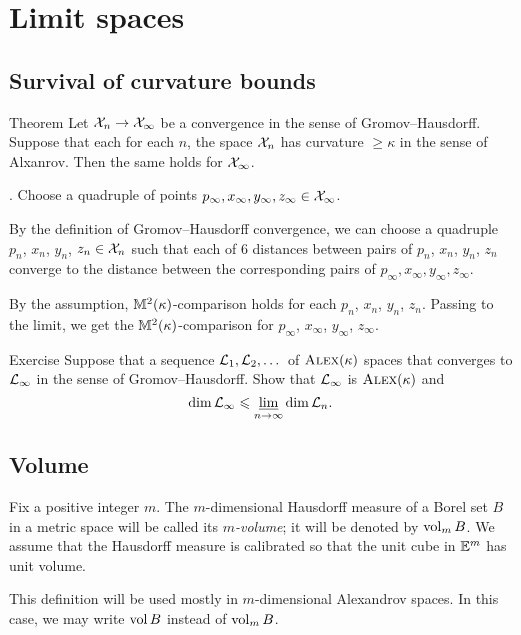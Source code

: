 \chapter{Limit spaces}\label{chap:lim}


\section{Survival of curvature bounds}

\begin{thm}{Theorem}\label{thm:CBB-closed}
Let $\spc{X}_n\z\to \spc{X}_\infty$ be a convergence in the sense of Gromov--Hausdorff.
Suppose that each for each $n$, the space $\mathcal{X}_n$ has curvature $\ge\kappa$ in the sense of Alxanrov.
Then the same holds for $\mathcal{X}_\infty$.
\end{thm}

.
Choose a quadruple of points $p_\infty, x_\infty,y_\infty,z_\infty\in \mathcal{X}_\infty$.

By the definition of Gromov--Hausdorff convergence, we can choose a quadruple $p_n$,  $x_n$, $y_n$, $z_n\in \mathcal{X}_n$ such that each of 6 distances between pairs of $p_n$, $x_n$, $y_n$, $z_n$ converge to the distance between the corresponding pairs of $p_\infty, x_\infty,y_\infty,z_\infty$.

By the assumption, $\mathbb{M}^2(\kappa)$-comparison holds for each $p_n$, $x_n$, $y_n$, $z_n$.
Passing to the limit, we get the $\mathbb{M}^2(\kappa)$-comparison for $p_\infty$,  $x_\infty$, $y_\infty$, $z_\infty$.
\qeds

\begin{thm}{Exercise}\label{ex:dim-lim}
Suppose that a sequence $\mathcal{L}_1,\mathcal{L}_2,\dots$ of $\textsc{Alex}(\kappa)$ spaces that converges to $\mathcal{L}_\infty$ in the sense of Gromov--Hausdorff.
Show that $\mathcal{L}_\infty$ is $\textsc{Alex}(\kappa)$ and
\[\operatorname{\rm dim}\nolimits \mathcal{L}_\infty\leqslant \varliminf_{n\to\infty} \operatorname{\rm dim}\nolimits \mathcal{L}_n.\]
\end{thm}


\section{Volume}

Fix a positive integer $m$.
The $m$-dimensional Hausdorff measure of a Borel set $B$ in a metric space will be called its \emph{$m$-volume}; it will be denoted by $\operatorname{\rm vol}\nolimits_m B$.
We assume that the Hausdorff measure is calibrated so that the unit cube in $\mathbb{E}^m$ has unit volume.

This definition will be used mostly in $m$-dimensional Alexandrov spaces.
In this case, we may write $\operatorname{\rm vol}\nolimits B$ instead of $\operatorname{\rm vol}\nolimits_m B$.


